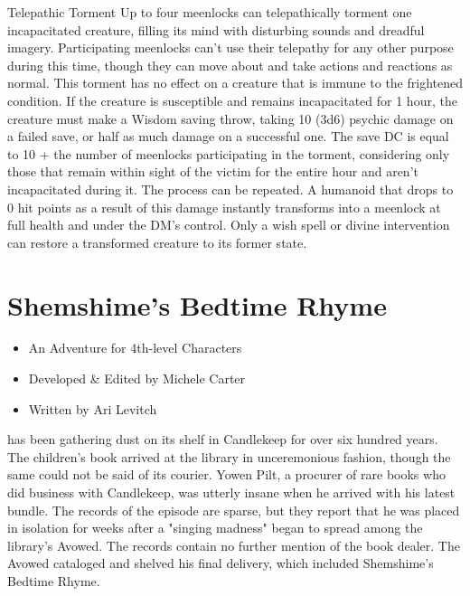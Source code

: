 \documentclass[10pt,a4paper,twoside,bg=print,twocolumn,openany,nodeprecatedcode]{dndbook}
\begin{document}
\begin{DndSidebar}[float=!b]{Telepathic Torment}
Up to four meenlocks can telepathically torment one incapacitated creature, filling its mind with disturbing sounds and dreadful imagery. Participating meenlocks can't use their telepathy for any other purpose during this time, though they can move about and take actions and reactions as normal. This torment has no effect on a creature that is immune to the frightened condition. If the creature is susceptible and remains incapacitated for 1 hour, the creature must make a Wisdom saving throw, taking 10 (3d6) psychic damage on a failed save, or half as much damage on a successful one. The save DC is equal to 10 + the number of meenlocks participating in the torment, considering only those that remain within sight of the victim for the entire hour and aren't incapacitated during it. The process can be repeated. A humanoid that drops to 0 hit points as a result of this damage instantly transforms into a meenlock at full health and under the DM's control. Only a wish spell or divine intervention can restore a transformed creature to its former state.



\end{DndSidebar}

\chapter{Shemshime's Bedtime Rhyme}

\begin{itemize}
\item An Adventure for 4th-level Characters
\item Developed \& Edited by Michele Carter
\item Written by Ari Levitch
\end{itemize}

 has been gathering dust on its shelf in Candlekeep for over six hundred years. The children's book arrived at the library in unceremonious fashion, though the same could not be said of its courier. Yowen Pilt, a procurer of rare books who did business with Candlekeep, was utterly insane when he arrived with his latest bundle. The records of the episode are sparse, but they report that he was placed in isolation for weeks after a "singing madness" began to spread among the library's Avowed. The records contain no further mention of the book dealer. The Avowed cataloged and shelved his final delivery, which included Shemshime's Bedtime Rhyme.
\end{document}
